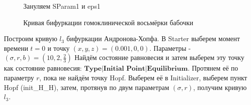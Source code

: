\documentclass[12pt, a4paper]{article}
\begin{document}
\begin{figure}[H]
	\caption{Зануляем SParam1 и eps1}
\end{figure}
\begin{figure}[H]
	\caption{Кривая бифуркации гомоклинической восьмёрки бабочки}
\end{figure}
Построим кривую $l_3$ бифуркации Андронова-Хопфа.
\newline
В Starter выберем момент времени $t=0$ и точку $(x,y,z) = (0.001, 0, 0)$. Параметры - $(\sigma, r, b) = (10, 2, \frac{2}{3})$ Найдём состояние равновесия и затем выберем эту точку как состояние равновесия: $\textbf{Type|Initial Point|Equilibrium}$. Протянем её по параметру $r$, пока не найдём точку Hopf. Выберем её в Initializer, выберем пункт Hopf (init\_H\_H), затем, протянув по двум параметрам $(\sigma, r)$, получим кривую $l_3$.
\end{document}
